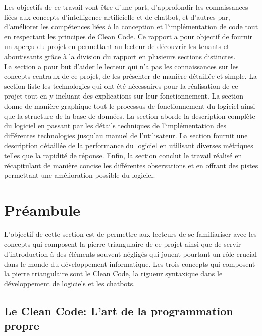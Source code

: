 \documentclass{rapport}
\begin{document}
Les objectifs de ce travail vont être d'une part, d'approfondir les connaissances liées aux concepts d'intelligence artificielle et de chatbot, et d'autres par, d'améliorer les compétences liées à la conception et l'implémentation de code tout en respectant les principes de Clean Code.
Ce rapport a pour objectif de fournir un aperçu du projet en permettant au lecteur de découvrir les tenants et aboutissants grâce à la division du rapport en plusieurs sections distinctes.\\

La section  a pour but d'aider le lecteur qui n'a pas les connaissances sur les concepts centraux de ce projet, de les présenter de manière détaillée et simple. La section  liste les technologies qui ont été nécessaires pour la réalisation de ce projet tout en y incluant des explications sur leur fonctionnement. La section  donne de manière graphique tout le processus de fonctionnement du logiciel ainsi que la structure de la base de données. La section  aborde la description complète du logiciel en passant par les détails techniques de l'implémentation des différentes technologies jusqu'au manuel de l'utilisateur. La section  fournit une description détaillée de la performance du logiciel en utilisant diverses métriques telles que la rapidité de réponse. Enfin, la section  conclut le travail réalisé en récapitulant de manière concise les différentes observations et en offrant des pistes permettant une amélioration possible du logiciel.

\newpage
\section{Préambule}
\label{Préambule}
L'objectif de cette section est de permettre aux lecteurs de se familiariser avec les concepts qui composent la pierre triangulaire de ce projet ainsi que de servir d'introduction à des éléments souvent négligés qui jouent pourtant un rôle crucial dans le monde du développement informatique. Les trois concepts qui composent la pierre triangulaire sont le Clean Code, la rigueur syntaxique dans le développement de logiciels et les chatbots.

\subsection{Le Clean Code: L'art de la programmation propre}
\end{document}
